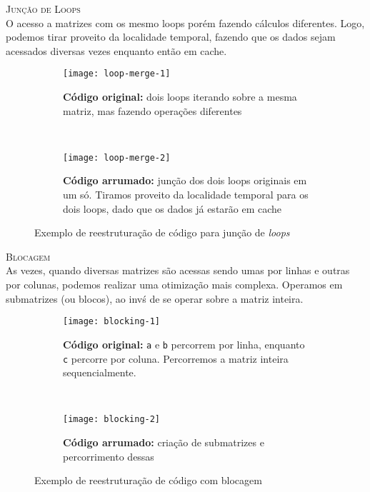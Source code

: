\textsc{Junção de Loops}\\
O acesso a matrizes com os mesmo loops porém fazendo cálculos diferentes. Logo, podemos tirar proveito da localidade temporal, fazendo que os dados sejam acessados diversas vezes enquanto então em cache.

\begin{figure*}[ht]
  \begin{subfigure}[t]{.5\textwidth}
    \centering
    \texttt{[image: loop-merge-1]}
    \caption{\textbf{Código original:} dois loops iterando sobre a mesma matriz, mas fazendo operações diferentes}
  \end{subfigure}
  ~
  \begin{subfigure}[t]{.5\textwidth}
    \centering
    \texttt{[image: loop-merge-2]}
    \caption{\textbf{Código arrumado:} junção dos dois loops originais em um só. Tiramos proveito da localidade temporal para os dois loops, dado que os dados já estarão em cache}
  \end{subfigure}

  \caption{Exemplo de reestruturação de código para junção de \textit{loops}}
  \label{figs:loop-merge}
\end{figure*}





\textsc{Blocagem}\\
As vezes, quando diversas matrizes são acessas sendo umas por linhas e outras por colunas, podemos realizar uma otimização mais complexa. Operamos em submatrizes (ou blocos), ao invś de se operar sobre a matriz inteira.

\begin{figure*}[H]
  \begin{subfigure}[t]{.45\textwidth}
    \centering
    \texttt{[image: blocking-1]}
    \caption{\textbf{Código original:} \texttt{a} e \texttt{b} percorrem por linha, enquanto \texttt{c} percorre por coluna. Percorremos a matriz inteira sequencialmente.}
  \end{subfigure}
  ~
  \begin{subfigure}[t]{.45\textwidth}
    \centering
    \texttt{[image: blocking-2]}
    \caption{\textbf{Código arrumado:} criação de submatrizes e percorrimento dessas}
  \end{subfigure}

  \caption{Exemplo de reestruturação de código com blocagem}
  \label{figs:blocking}
\end{figure*}




